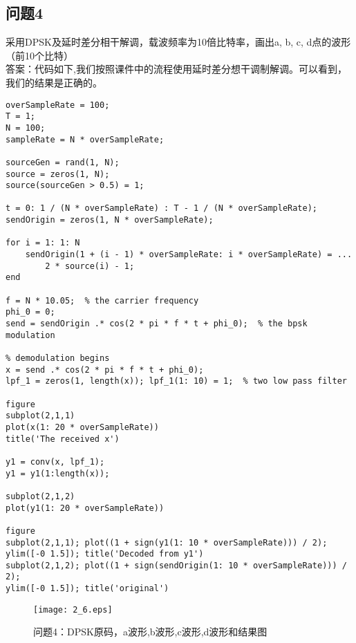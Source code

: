 \documentclass{article}
\begin{document}
\subsection{问题4}采用DPSK及延时差分相干解调，载波频率为10倍比特率，画出a, b, c, d点的波形（前10个比特）\\
答案：代码如下,我们按照课件中的流程使用延时差分想干调制解调。可以看到，我们的结果是正确的。
\begin{lstlisting}
overSampleRate = 100;
T = 1;
N = 100;
sampleRate = N * overSampleRate;

sourceGen = rand(1, N);
source = zeros(1, N);
source(sourceGen > 0.5) = 1;

t = 0: 1 / (N * overSampleRate) : T - 1 / (N * overSampleRate);
sendOrigin = zeros(1, N * overSampleRate);

for i = 1: 1: N
    sendOrigin(1 + (i - 1) * overSampleRate: i * overSampleRate) = ...
        2 * source(i) - 1;
end

f = N * 10.05;  % the carrier frequency
phi_0 = 0;
send = sendOrigin .* cos(2 * pi * f * t + phi_0);  % the bpsk modulation

% demodulation begins
x = send .* cos(2 * pi * f * t + phi_0);
lpf_1 = zeros(1, length(x)); lpf_1(1: 10) = 1;  % two low pass filter

figure
subplot(2,1,1)
plot(x(1: 20 * overSampleRate))
title('The received x')

y1 = conv(x, lpf_1);
y1 = y1(1:length(x));

subplot(2,1,2)
plot(y1(1: 20 * overSampleRate))

figure
subplot(2,1,1); plot((1 + sign(y1(1: 10 * overSampleRate))) / 2);
ylim([-0 1.5]); title('Decoded from y1')
subplot(2,1,2); plot((1 + sign(sendOrigin(1: 10 * overSampleRate))) / 2);
ylim([-0 1.5]); title('original')
\end{lstlisting}
\begin{figure}[!h]
\begin{center}
		\texttt{[image: 2\_6.eps]}
		\caption{问题4：DPSK原码，a波形,b波形,c波形,d波形和结果图}
\end{center}
\end{figure}
\end{document}
